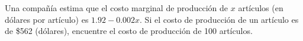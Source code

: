 \item Una compañía estima que el costo marginal de producción de $x$ artículos (en dólares por artículo) es $1.92 - 0.002x$. Si el costo de producción de un artículo es de \$562 (dólares), encuentre el costo de producción de 100 artículos.
